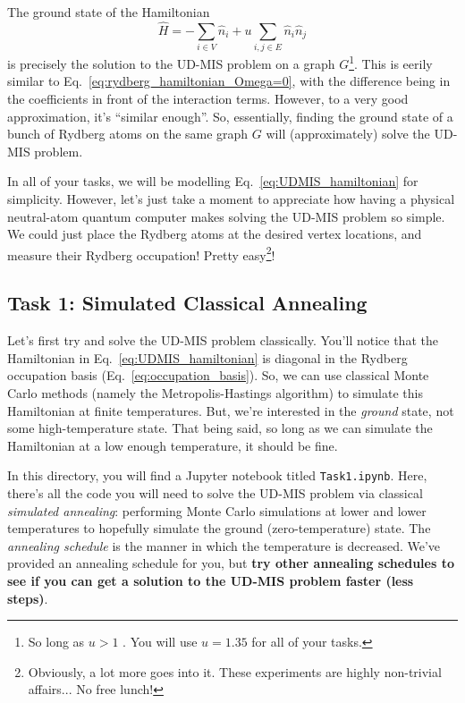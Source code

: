 \documentclass[12pt]{article}
\begin{document}
The ground state of the Hamiltonian
\begin{equation} \label{eq:UDMIS_hamiltonian}
	\hat{H} = -\sum_{i \in V} \hat{n}_i + u \sum_{i,j \in E} \hat{n}_i \hat{n}_j
\end{equation}
is precisely the solution to the UD-MIS problem on a graph $G$\footnote{So long as $u > 1$ \cite{serret_solving_2020}. You will use $u = 1.35$ for all of your tasks.}.
This is eerily similar to Eq.~\ref{eq:rydberg_hamiltonian_Omega=0}, with the difference being in the coefficients in front of the interaction terms.
However, to a very good approximation, it's ``similar enough''.
So, essentially, finding the ground state of a bunch of Rydberg atoms on the same graph $G$ will (approximately) solve the UD-MIS problem.

In all of your tasks, we will be modelling Eq.~\ref{eq:UDMIS_hamiltonian} for simplicity.
However, let's just take a moment to appreciate how having a physical neutral-atom quantum computer makes solving the UD-MIS problem so simple.
We could just place the Rydberg atoms at the desired vertex locations, and measure their Rydberg occupation! Pretty easy\footnote{Obviously, a lot more goes into it. These experiments are highly non-trivial affairs... No free lunch!}!

\subsection*{Task 1: Simulated Classical Annealing}

Let's first try and solve the UD-MIS problem classically.
You'll notice that the Hamiltonian in Eq.~\ref{eq:UDMIS_hamiltonian} is diagonal in the Rydberg occupation basis (Eq.~\ref{eq:occupation_basis}).
So, we can use classical Monte Carlo methods (namely the Metropolis-Hastings algorithm) to simulate this Hamiltonian at finite temperatures.
But, we're interested in the {\it ground} state, not some high-temperature state.
That being said, so long as we can simulate the Hamiltonian at a low enough temperature, it should be fine.

In this directory, you will find a Jupyter notebook titled \texttt{Task1.ipynb}.
Here, there's all the code you will need to solve the UD-MIS problem via classical {\it simulated annealing}: performing Monte Carlo simulations at lower and lower temperatures to hopefully simulate the ground (zero-temperature) state.
The {\it annealing schedule} is the manner in which the temperature is decreased.
We've provided an annealing schedule for you, but {\bf try other annealing schedules to see if you can get a solution to the UD-MIS problem faster (less steps)}.
\end{document}
